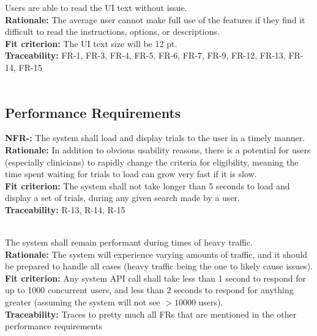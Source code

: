\documentclass[12pt, titlepage]{article}
\newcounter{NFR_Counter}
\newcounter{FR_Counter}
\begin{document}
Users are able to read the UI text without issue. \\
\textbf{Rationale:}
The average user cannot make full use of the features if they find it difficult to read the instructions, options, or descriptions. \\
\textbf{Fit criterion:}
The UI text size will be 12 pt. \\
\textbf{Traceability:}
FR-1, FR-3, FR-4, FR-5, FR-6, FR-7, FR-9, FR-12, FR-13, FR-14, FR-15 \\~\\
\addtocounter{NFR_Counter}{1}


\subsection{Performance Requirements}

\textbf{NFR-\the\value{NFR_Counter}:}
The system shall load and display trials to the user in a timely manner.\\
\textbf{Rationale:}
In addition to obvious usability reasons, there is a potential for users (especially clinicians) to rapidly
change the criteria for eligibility, meaning the time spent waiting for trials to load can grow very fast if it is slow.\\
\textbf{Fit criterion:}
The system shall not take longer than 5 seconds to load and display a set of trials, during any given search made by a user.\\
\textbf{Traceability:}
R-13, R-14, R-15 \\~\\
\addtocounter{NFR_Counter}{1}

The system shall remain performant during times of heavy traffic.\\
\textbf{Rationale:}
The system will experience varying amounts of traffic, and it should be prepared to handle all cases (heavy traffic being the 
one to likely cause issues).\\
\textbf{Fit criterion:}
Any system API call shall take less than 1 second to respond for up to 1000 concurrent users, and less than 2 seconds to respond for anything 
greater (assuming the system will not see $>10000$ users).\\
\textbf{Traceability:}
Traces to pretty much all FRs that are mentioned in the other performance requirements \\~\\
\addtocounter{NFR_Counter}{1}
\end{document}
